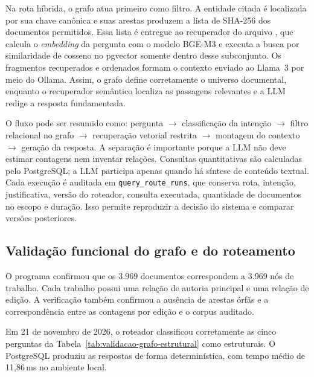 Na rota híbrida, o grafo atua primeiro como filtro. A entidade citada é localizada por sua chave canônica e suas arestas produzem a lista de SHA-256 dos documentos permitidos. Essa lista é entregue ao recuperador do arquivo , que calcula o \textit{embedding} da pergunta com o modelo BGE-M3 e executa a busca por similaridade de cosseno no pgvector somente dentro desse subconjunto. Os fragmentos recuperados e ordenados formam o contexto enviado ao Llama~3 por meio do Ollama. Assim, o grafo define corretamente o universo documental, enquanto o recuperador semântico localiza as passagens relevantes e a LLM redige a resposta fundamentada.

O fluxo pode ser resumido como: pergunta $\rightarrow$ classificação da intenção $\rightarrow$ filtro relacional no grafo $\rightarrow$ recuperação vetorial restrita $\rightarrow$ montagem do contexto $\rightarrow$ geração da resposta. A separação é importante porque a LLM não deve estimar contagens nem inventar relações. Consultas quantitativas são calculadas pelo PostgreSQL; a LLM participa apenas quando há síntese de conteúdo textual. Cada execução é auditada em \texttt{query\_route\_runs}, que conserva rota, intenção, justificativa, versão do roteador, consulta executada, quantidade de documentos no escopo e duração. Isso permite reproduzir a decisão do sistema e comparar versões posteriores.

\subsection{Validação funcional do grafo e do roteamento}

O programa  confirmou que os 3.969 documentos correspondem a 3.969 nós de trabalho. Cada trabalho possui uma relação de autoria principal e uma relação de edição. A verificação também confirmou a ausência de arestas órfãs e a correspondência entre as contagens por edição e o corpus auditado.

Em 21 de novembro de 2026, o roteador classificou corretamente as cinco perguntas da Tabela~\ref{tab:validacao-grafo-estrutural} como estruturais. O PostgreSQL produziu as respostas de forma determinística, com tempo médio de 11,86\,ms no ambiente local.

